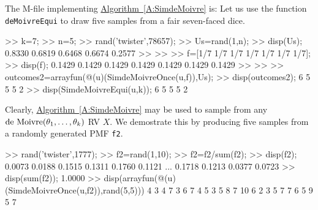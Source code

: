 \begin{simulation}
The M-file implementing \hyperref[A:SimdeMoivre]{Algorithm~\ref*{A:SimdeMoivre}} is:
Let us use the function {\tt deMoivreEqui} to draw five samples from a fair seven-faced dice.
\begin{VrbM}
>> k=7; %
>> n=5; %
>> rand('twister',78657); %
>> Us=rand(1,n); %
>> disp(Us);
    0.8330    0.6819    0.6468    0.6674    0.2577
>> %
>> %
>> f=[1/7 1/7 1/7 1/7 1/7 1/7 1/7];
>> disp(f);
    0.1429    0.1429    0.1429    0.1429    0.1429    0.1429    0.1429
>> %
>> %
>> outcomes2=arrayfun(@(u)(SimdeMoivreOnce(u,f)),Us);
>> disp(outcomes2);
     6     5     5     5     2
>> disp(SimdeMoivreEqui(u,k)); %
     6     5     5     5     2
\end{VrbM}
Clearly, \hyperref[A:SimdeMoivre]{Algorithm~\ref*{A:SimdeMoivre}} may be used to sample from any $\mbox{{\rm de~Moivre}}(\theta_1,\ldots,\theta_k)$ RV $X$.  We demostrate this by producing five samples from a randomly generated PMF {\tt f2}.
\begin{VrbM}
>> rand('twister',1777); %
>> f2=rand(1,10); %
>> f2=f2/sum(f2); %
>> disp(f2); %
    0.0073    0.0188    0.1515    0.1311    0.1760    0.1121    ...
    0.1718    0.1213    0.0377    0.0723
>> disp(sum(f2)); %
    1.0000
>> disp(arrayfun(@(u)(SimdeMoivreOnce(u,f2)),rand(5,5))) %
     4     3     4     7     3
     6     7     4     5     3
     5     8     7    10     6
     2     3     5     7     7
     6     5     9     5     7
\end{VrbM}
\end{simulation}

